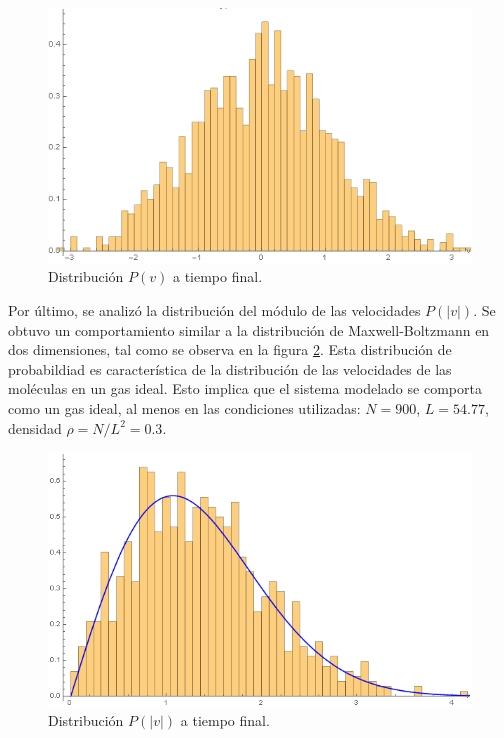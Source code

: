 \documentclass[aps,prb,twocolumn,superscriptaddress,floatfix,longbibliography]{revtex4-2}
\newif\ifptitle
\newif\ifpnumber
\newcounter{para}
\newcommand\ptitle[1]{\par\refstepcounter{para}
{\ifpnumber{\noindent\textcolor{lightgray}{\textbf{\thepara}}\indent}\fi}
{\ifptitle{\textbf{[{#1}]}}\fi}}
\begin{document}
\begin{figure}[h]
    \includegraphics[clip=true,width=0.75\columnwidth]{histo_pv_final.png}
    \caption{Distribución $P(v)$ a tiempo final.}
     \label{fig:histo_pv_final}
\end{figure}


\ptitle{Distribución del módulo de la velocidad}

Por último, se analizó la distribución del módulo de las velocidades $P(|v|)$. Se obtuvo un comportamiento similar a la distribución de Maxwell-Boltzmann en dos dimensiones, tal como se observa en la figura \ref{fig:histo_pvmod_final}. Esta distribución de probabildiad es característica de la distribución de las velocidades de las moléculas en un gas ideal. Esto implica que el sistema modelado se comporta como un gas ideal, al menos en las condiciones utilizadas: $N = 900$, $L = 54.77$, densidad $\rho = N/L^2 = 0.3$.

\begin{figure}[h]
    \includegraphics[clip=true,width=0.75\columnwidth]{histo_pvmod_final.png}
    \caption{Distribución $P(|v|)$ a tiempo final.}
     \label{fig:histo_pvmod_final}
\end{figure}




\end{document}
